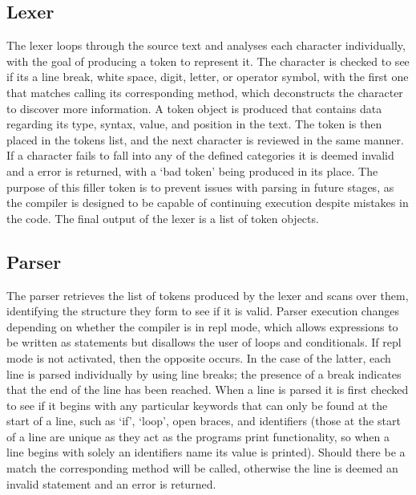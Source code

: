 \documentclass[
]{report}
\begin{document}
\subsection{Lexer}
The lexer loops through the source text and analyses each character
individually, with the goal of producing a \gls{token} to represent it. The
character is checked to see if its a line break, white space, digit,
letter, or operator \gls{symbol}, with the first one that matches calling its
corresponding method, which deconstructs the character to discover more
information. A \gls{token} object is produced that contains data regarding its
type, syntax, value, and position in the text. The \gls{token} is then placed
in the \glspl{token} list, and the next character is reviewed in the same
manner. If a character fails to fall into any of the defined categories
it is deemed invalid and a error is returned, with a `bad \gls{token}' being
produced in its place. The purpose of this filler \gls{token} is to prevent
issues with \gls{parsing} in future stages, as the compiler is designed to be
capable of continuing execution despite mistakes in the code. The final
output of the lexer is a list of \gls{token} objects.

\subsection{Parser}
The parser retrieves the list of \glspl{token} produced by the lexer and scans
over them, identifying the structure they form to see if it is valid.
Parser execution changes depending on whether the compiler is in \acrshort{repl}
mode, which allows \glspl{expression} to be written as \glspl{statement} but disallows
the user of loops and conditionals. If \acrshort{repl} mode is not activated, then
the opposite occurs. In the case of the latter, each line is parsed
individually by using line breaks; the presence of a break indicates
that the end of the line has been reached. When a line is parsed it is
first checked to see if it begins with any particular \glspl{keyword} that can
only be found at the start of a line, such as `if', `loop', open braces,
and \glspl{identifier} (those at the start of a line are unique as they act as
the programs print functionality, so when a line begins with solely an
\glspl{identifier} name its value is printed). Should there be a match the
corresponding method will be called, otherwise the line is deemed an
invalid \gls{statement} and an error is returned.
\end{document}
